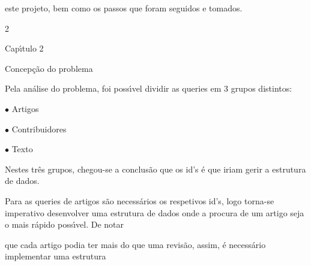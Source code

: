 \documentclass[a4paper,portrait,12pt]{article}
\begin{document}
\begin{flushleft}
este projeto, bem como os passos que foram seguidos e tomados.
\end{flushleft}





2





\begin{flushleft}
\newpage
Cap\i{}́tulo 2
\end{flushleft}





\begin{flushleft}
Concepção do problema
\end{flushleft}


\begin{flushleft}
Pela análise do problema, foi poss\i{}́vel dividir as queries em 3 grupos distintos:
\end{flushleft}





\begin{flushleft}
$\bullet$ Artigos
\end{flushleft}


\begin{flushleft}
$\bullet$ Contribuidores
\end{flushleft}


\begin{flushleft}
$\bullet$ Texto
\end{flushleft}





\begin{flushleft}
Nestes três grupos, chegou-se a conclusão que os id's é que iriam gerir a estrutura de dados.
\end{flushleft}


\begin{flushleft}
Para as queries de artigos são necessários os respetivos id's, logo torna-se imperativo desenvolver uma estrutura de dados onde a procura de um artigo seja o mais rápido poss\i{}́vel. De notar
\end{flushleft}


\begin{flushleft}
que cada artigo podia ter mais do que uma revisão, assim, é necessário implementar uma estrutura
\end{flushleft}
\end{document}
